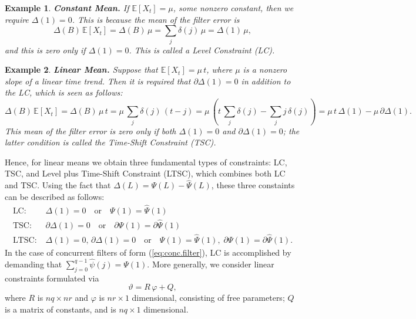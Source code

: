 \documentclass[a4paper]{book}
\def\EE{\mathbb E}
\newtheorem{Example}{Example}
\begin{document}
\begin{Example}    {\bf Constant Mean.}  \rm
\label{exam:constant.mean}
  If $\EE [ X_t ] = \mu$, some nonzero constant,  then we require $\Delta (1) = 0$.
  This is because the mean of the filter error is
  \[
   \Delta (B) \, \EE [ X_t] = \Delta(B) \, \mu = \sum_j \delta (j) \, \mu =
   \Delta (1) \, \mu,
  \]
  and this is zero only if $\Delta (1) = 0$.  This is called a Level Constraint (LC).
\end{Example}  

\begin{Example}    {\bf Linear Mean.}  \rm
\label{exam:linear.mean}
  Suppose that $\EE [ X_t ] = \mu \, t$, where $\mu$ is a nonzero slope
 of a linear time trend.  Then it is required that  $\partial {\Delta} (1) = 0$
  in addition to the LC,  which is seen as follows:
  \[
   \Delta (B) \, \EE [ X_t] = \Delta(B) \, \mu \, t =   \mu \, \sum_j \delta (j) \, (t-j)
   = \mu \, \left(t \, \sum_j \delta (j) - \sum_j j \,\delta (j) \right)
    = \mu \, t \, \Delta(1) - \mu \, \partial \Delta (1).
  \]
  This mean of the filter error  is zero only if both $\Delta(1)=0$ and
  $\partial \Delta (1)=0$; the latter condition is called the
   Time-Shift Constraint (TSC).  
\end{Example}  

     Hence, for linear means we obtain
 three fundamental types of constraints: LC, TSC, and Level plus 
 Time-Shift Constraint (LTSC), which combines both LC and TSC.
  Using the fact that $\Delta (L) = \Psi (L) - \widehat{\Psi} (L)$,
   these three constaints can be described as follows:
\begin{align*}
 \mbox{LC} : &  \;  \Delta (1) = 0 \quad \mbox{or} \quad \Psi (1) = \widehat{\Psi} (1) \\
 \mbox{TSC} : &  \;   \partial {\Delta} (1) = 0 \quad \mbox{or} \quad 
 \partial {\Psi} (1) = \partial {\widehat{\Psi}} (1)  \\
 \mbox{LTSC} : &  \;  \Delta (1) = 0,  \,  \partial {\Delta} (1) = 0 \quad 
 \mbox{or} \quad \Psi (1) = \widehat{\Psi} (1), \; \partial {\Psi} (1) =
 \partial {\widehat{\Psi}} (1).
\end{align*}
 In the case of  concurrent filters of form  (\ref{eq:conc.filter}), 
 LC is accomplished by demanding that 
  $\sum_{j=0}^{q-1} \widehat{\psi} (j) = \Psi(1)$.   More generally, we consider  linear constraints  formulated via
\begin{equation}
\label{eq:concurrent-constrain}
  \vartheta = R \, \varphi + Q,
\end{equation}
 where $R$ is $n q \times n r$ and $\varphi$ is $n r \times 1$ dimensional, consisting of 
 free parameters; $Q$ is a matrix of constants, and is $n q \times 1$ dimensional.
\end{document}
